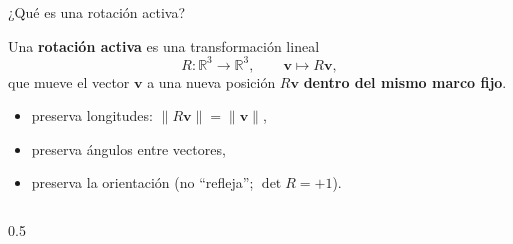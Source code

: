 \documentclass[11pt]{beamer}
\begin{document}
\begin{frame}{¿Qué es una rotación activa?}

Una \textbf{rotación activa} es una transformación lineal
\[
R : \mathbb{R}^3 \to \mathbb{R}^3, \qquad \bm{v} \mapsto R\bm{v},
\]
que mueve el vector \(\bm{v}\) a una nueva posición \(R\bm{v}\) \textbf{dentro del mismo marco fijo}.

\medskip
\begin{itemize}
  \item preserva longitudes: \(\|R\bm{v}\| = \|\bm{v}\|\),
  \item preserva ángulos entre vectores,
  \item preserva la orientación (no ``refleja''; \(\det R = +1\)).
\end{itemize}

\medskip
\begin{columns}[T]
%
%
%
%
%
%


    \begin{column}{0.5\textwidth}
    \centering
\end{column}
\end{columns}
\end{frame}
\end{document}
